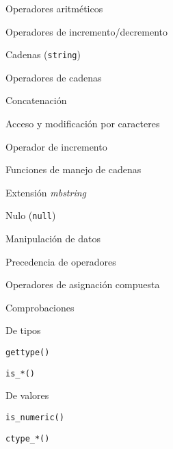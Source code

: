 \begin{longenum}
\begin{longenum}
\begin{longenum}
\begin{longenum}
\begin{longenum}
                    \item Operadores aritméticos
                    \item Operadores de incremento/decremento
                \end{longenum}
            \end{longenum}
            \item Cadenas (\texttt{string})
            \begin{longenum}
                \item Operadores de cadenas
                \begin{longenum}
                    \item Concatenación
                    \item Acceso y modificación por caracteres
                    \item Operador de incremento \opcional\
                \end{longenum}
                \item Funciones de manejo de cadenas
                \item Extensión \textit{mbstring}
            \end{longenum}
            \item Nulo (\texttt{null})
        \end{longenum}
        \item Manipulación de datos
        \begin{longenum}
            \item Precedencia de operadores
            \item Operadores de asignación compuesta
            \item Comprobaciones
            \begin{longenum}
                \item De tipos
                \begin{longenum}
                    \item \texttt{gettype()}
                    \item \texttt{is\_*()}
                \end{longenum}
                \item De valores
                \begin{longenum}
                    \item \texttt{is\_numeric()}
                    \item \texttt{ctype\_*()}
                \end{longenum}

\end{longenum}
\end{longenum}
\end{longenum}
\end{longenum}
